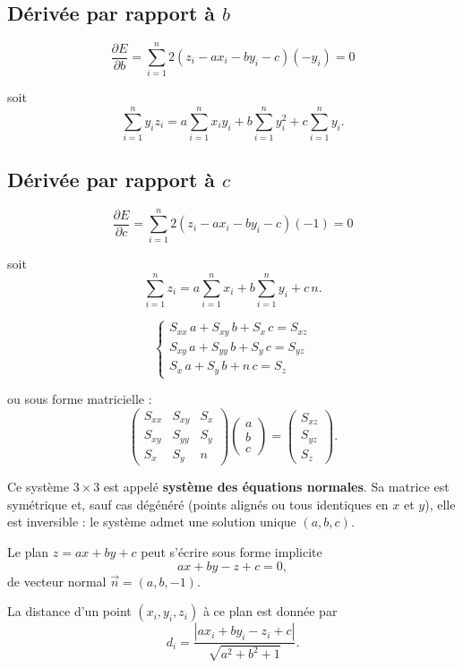 \subsection*{Dérivée par rapport à $b$}

\[
\frac{\partial E}{\partial b}
= \sum_{i=1}^n 2\left( z_i - a x_i - b y_i - c \right)(-y_i) = 0
\]

soit
\[
\sum_{i=1}^n y_i z_i = a \sum_{i=1}^n x_i y_i + b \sum_{i=1}^n y_i^2 + c \sum_{i=1}^n y_i.
\]

\subsection*{Dérivée par rapport à $c$}

\[
\frac{\partial E}{\partial c}
= \sum_{i=1}^n 2\left( z_i - a x_i - b y_i - c \right)(-1) = 0
\]

soit
\[
\sum_{i=1}^n z_i = a \sum_{i=1}^n x_i + b \sum_{i=1}^n y_i + c\, n.
\]

\[
\begin{cases}
S_{xx}\, a + S_{xy}\, b + S_x\, c = S_{xz} \\
S_{xy}\, a + S_{yy}\, b + S_y\, c = S_{yz} \\
S_x\, a    + S_y\, b    + n\, c   = S_z
\end{cases}
\]

ou sous forme matricielle :
\[
\begin{pmatrix}
S_{xx} & S_{xy} & S_x \\
S_{xy} & S_{yy} & S_y \\
S_x    & S_y    & n
\end{pmatrix}
\begin{pmatrix} a \\ b \\ c \end{pmatrix}
=
\begin{pmatrix} S_{xz} \\ S_{yz} \\ S_z \end{pmatrix}.
\]

Ce système $3 \times 3$ est appelé \textbf{système des équations normales}.
Sa matrice est symétrique et, sauf cas dégénéré (points alignés ou tous
identiques en $x$ et $y$), elle est inversible : le système admet une solution
unique $(a, b, c)$.

Le plan $z = ax + by + c$ peut s'écrire sous forme implicite
\[
ax + by - z + c = 0,
\]
de vecteur normal $\vec{n} = (a, b, -1)$.

La distance d'un point $(x_i, y_i, z_i)$ à ce plan est donnée par
\[
d_i = \frac{|a x_i + b y_i - z_i + c|}{\sqrt{a^2 + b^2 + 1}}.
\]

 
